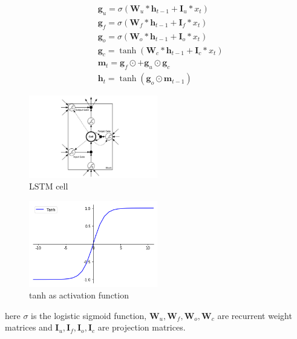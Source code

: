 \documentclass[5p]{elsarticle}
\begin{document}
\begin{equation}
	\begin{split}
		& \mathbf g_u = \sigma(\mathbf W_u * \mathbf h_{t-1} + \mathbf I_u * x_t) \\
		& \mathbf g_f = \sigma(\mathbf W_f * \mathbf h_{t-1} + \mathbf I_f * x_t) \\
		& \mathbf g_o = \sigma(\mathbf W_o * \mathbf h_{t-1} + \mathbf I_o * x_t) \\
		& \mathbf g_c = \tanh(\mathbf W_c * \mathbf h_{t-1} + \mathbf I_c *  x_t) \\
		& \mathbf m_t = \mathbf g_f \odot \mathbf +  \mathbf g_u \odot \mathbf g_c \\
		& \mathbf h_t = \tanh(\mathbf g_o \odot \mathbf m_{t-1}) 
	\end{split}
\end{equation}

\begin{figure}[h]
    \centering
    \includegraphics[width=0.5\textwidth]{lstm_cell.png}
    \caption{LSTM cell}
    \label{fig:LSTMCELL}
\end{figure}

\begin{figure}[h]
    \centering
    \includegraphics[width=0.5\textwidth]{tanh.png}
    \caption{tanh as activation function}
    \label{fig:tanh}
\end{figure}

here $\sigma$ is the logistic sigmoid function, $\mathbf W_u, \mathbf W_f, \mathbf W_o, \mathbf W_c$ are recurrent weight matrices and $\mathbf I_u, \mathbf I_f, \mathbf I_o, \mathbf I_c$ are projection matrices.
\end{document}
